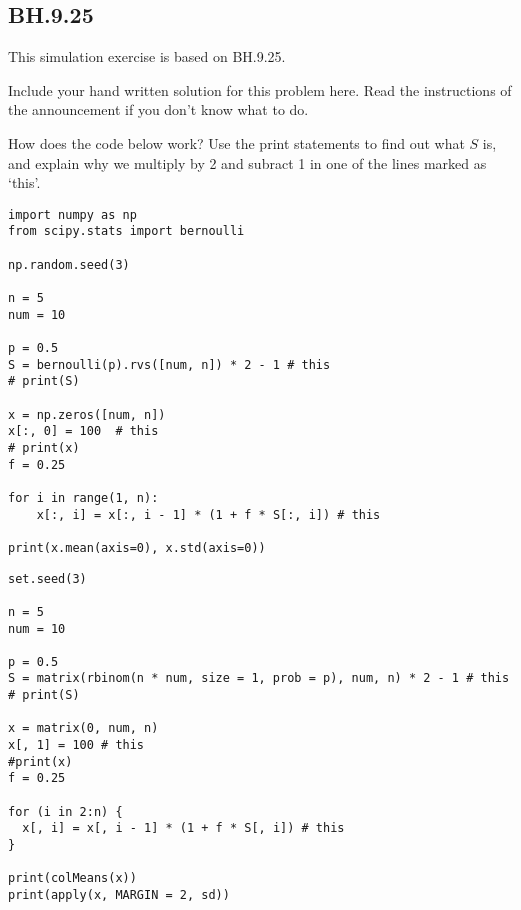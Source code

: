 

\subsection{BH.9.25}

This simulation exercise is based on BH.9.25.


\begin{exercise}
Include your hand written solution for this problem here. Read the instructions of the announcement if you don't know what to do.
\end{exercise}

\begin{exercise}
How does the code below work? Use the print statements to find out what $S$ is, and explain why we multiply by 2 and subract 1 in one of the lines marked as `this'.

\begin{verbatim}
import numpy as np
from scipy.stats import bernoulli

np.random.seed(3)

n = 5
num = 10

p = 0.5
S = bernoulli(p).rvs([num, n]) * 2 - 1 # this
# print(S)

x = np.zeros([num, n])
x[:, 0] = 100  # this
# print(x)
f = 0.25

for i in range(1, n):
    x[:, i] = x[:, i - 1] * (1 + f * S[:, i]) # this

print(x.mean(axis=0), x.std(axis=0))
\end{verbatim}

\begin{verbatim}
set.seed(3)

n = 5
num = 10

p = 0.5
S = matrix(rbinom(n * num, size = 1, prob = p), num, n) * 2 - 1 # this
# print(S)

x = matrix(0, num, n)
x[, 1] = 100 # this
#print(x)
f = 0.25

for (i in 2:n) {
  x[, i] = x[, i - 1] * (1 + f * S[, i]) # this
}

print(colMeans(x))
print(apply(x, MARGIN = 2, sd))
\end{verbatim}
\end{exercise}



